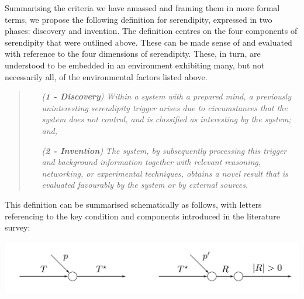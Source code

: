 Summarising the criteria we have amassed and framing them in more
formal terms, we propose the following definition for serendipity,
expressed in two phases: discovery and invention.  The definition
centres on the four components of serendipity that were outlined
above.  These can be made sense of and evaluated with reference to the
four dimensions of serendipity.  These, in turn, are understood to be
embedded in an environment exhibiting many, but not necessarily all,
of the environmental factors listed above.

\begin{quote}
\begin{enumerate}[itemsep=2pt,labelwidth=9em,leftmargin=9em,rightmargin=2em]
\item[\emph{(\textbf{1 - Discovery})}] \emph{Within a system with a prepared mind, a previously uninteresting serendipity trigger arises due to circumstances that the system does not control, and is classified as interesting by the system; and,}
\item[\emph{(\textbf{2 - Invention})}] \emph{The system, by subsequently processing this trigger and background information together with relevant reasoning, networking, or experimental techniques, obtains a novel result that is evaluated favourably by the system or by external sources.}
\end{enumerate}
\end{quote}

\noindent This definition can be summarised schematically as follows, with letters referencing to the key condition and components introduced in the literature survey: 

% 
{\centering
\includegraphics[width=.8\textwidth]{schematic}
\par}


